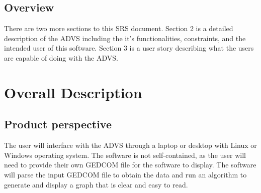 \documentclass[onecolumn, draftclsnofoot, 10pt, compsoc]{IEEEtran}
\begin{document}


\subsection{Overview}
\begin{singlespace}
	There are two more sections to this SRS document. Section 2 is a detailed description of the ADVS including the it's functionalities, constraints, and the intended user of this software. Section 3 is a user story describing what the users are capable of doing with the ADVS.
\end{singlespace}

\section{Overall Description}
\subsection{Product perspective}
\begin{singlespace}
	The user will interface with the ADVS through a laptop or desktop with Linux or Windows operating system. The software is not self-contained, as the user will need to provide their own GEDCOM file for the software to display. The software will parse the input GEDCOM file to obtain the data and run an algorithm to generate and display a graph that is clear and easy to read.
\end{singlespace}
\end{document}

